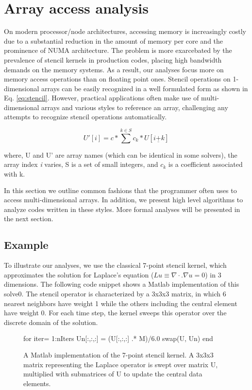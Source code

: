 \documentclass{article}
\begin{document}
\section{Array access analysis}
On modern processor/node architectures, accessing memory is increasingly costly due to a substantial reduction in the amount of memory per core and the prominence of NUMA architecture.
The problem is more exarcebated by the prevalence of stencil kernels in production codes, placing high bandwidth demands on the memory systems.
As a result, our analyses focus more on memory access operations than on floating point ones.
Stencil operations on 1-dimensional arrays can be easily recognized in a well formulated form as shown in Eq. \ref{eq:stencil}.
However, practical applications often make use of multi-dimensional arrays and various styles to reference an array, challenging any attempts to recognize stencil operations automatically.

\begin{equation}
U'[i] = c * \sum^{k \in S} c_{k} * U[i \underline{+} k] 
\label{eq:stencil}
\end{equation}

where, U and U' are array names (which can be identical in some solvers), the array index {\em i} varies, S is a set of small integers, and {\em $c_{k}$} is a coefficient associated with k.

In this section we outline common fashions that the programmer often uses to access multi-dimensional arrays.
In addition, we present high level algorithms to analyze codes written in these styles.
More formal analyses will be presented in the next section.


\subsection{Example}
To illustrate our analyses, we use the classical 7-point stencil kernel, which approximates the solution for Laplace's equation ($Lu \equiv \nabla \cdot . \nabla u = 0$) in 3 dimensions.
The following code snippet shows a Matlab implementation of this solve0.
The stencil operator is characterized by a 3x3x3 matrix, in which 6 nearest neighbors have weight 1 while the others including the central element have weight 0.
For each time step, the kernel sweeps this operator over the discrete domain of the solution.

\begin{figure}[htp]
\begin{boxedverbatim}
    for iter= 1:nIters
      Un[:,:,:] = (U[:,:,:] .* M)/6.0 
      swap(U, Un)
    end
\end{boxedverbatim}
\caption{A Matlab implementation of the 7-point stencil kernel. A 3x3x3 matrix representing the Laplace operator is swept over matrix U, multiplied with submatrices of U to update the central data elements.}
\label{7pointstencil}
\end{figure}
\end{document}
